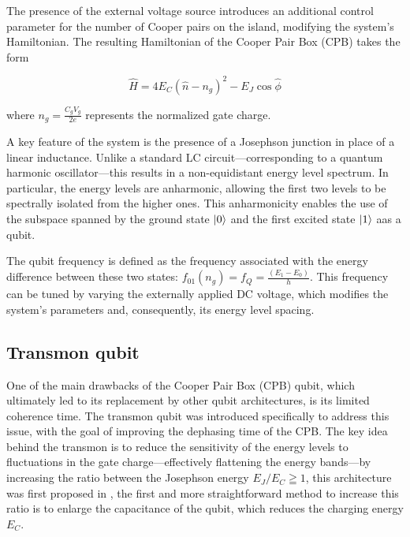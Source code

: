 The presence of the external voltage source introduces an additional control parameter for the number of Cooper pairs on the island, modifying the system's Hamiltonian. 
The resulting Hamiltonian of the Cooper Pair Box (CPB) takes the form

\begin{equation}\label{eq:CPB_complete}
    \hat{H} = 4E_C(\hat{n} - n_g)^2 - E_J \cos{\hat{\phi}}
\end{equation}

where $n_g = \frac{C_g V_g}{2e}$ represents the normalized gate charge.

A key feature of the system is the presence of a Josephson junction in place of a linear inductance. 
Unlike a standard LC circuit—corresponding to a quantum harmonic oscillator—this results in a non-equidistant energy level spectrum. 
In particular, the energy levels are anharmonic, allowing the first two levels to be spectrally isolated from the higher ones. 
This anharmonicity enables the use of the subspace spanned by the ground state $\ket{0}$ and the first excited state $\ket{1}$ aas a qubit.

The qubit frequency is defined as the frequency associated with the energy difference between these two states: $f_{01}(n_g) = f_Q = \frac{(E_1 - E_0)}{h}$.
This frequency can be tuned by varying the externally applied DC voltage, which modifies the system’s parameters and, consequently, its energy level spacing.\\



\subsection{Transmon qubit}
One of the main drawbacks of the Cooper Pair Box (CPB) qubit, which ultimately led to its replacement by other qubit architectures, is its limited coherence time. 
The transmon qubit was introduced specifically to address this issue, with the goal of improving the dephasing time of the CPB. The key idea behind the transmon is to reduce the sensitivity of the energy levels to fluctuations in the gate charge—effectively flattening the energy bands—by increasing the ratio between the Josephson energy $E_J/E_C \geqq 1$,
this architecture was first proposed in \cite{TransmonPaper}, the first and more straightforward method to increase this ratio is to enlarge the capacitance of the qubit, which reduces the charging energy $E_C$.


